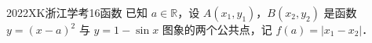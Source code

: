 
\begin{problem}{2022}{XK}{浙江学考}{16}{函数}
已知 $a\in\mathbb{R}$，设 $A(x_1,y_1)$，$B(x_2,y_2)$ 是函数 $y=(x-a)^2$ 与 $y=1-\sin x$ 图象的两个公共点，记 $f(a)=|x_1-x_2|$．

\begin{choices}
\end{choices}
\end{problem}